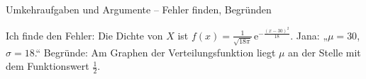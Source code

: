 \begin{aufgabe}{Umkehraufgaben und Argumente – Fehler finden, Begründen}
\begin{teile}
\teil Ich finde den Fehler: Die Dichte von $X$ ist $f(x) = \frac{1}{\sqrt{18\pi}} \, \mathrm{e}^{-\frac{(x - 30)^2}{18}}$. Jana: „$\mu = 30$, $\sigma = 18$.“
\teil Begründe: Am Graphen der Verteilungsfunktion liegt $\mu$ an der Stelle mit dem Funktionswert $\frac{1}{2}$.
\end{teile}
\end{aufgabe}
